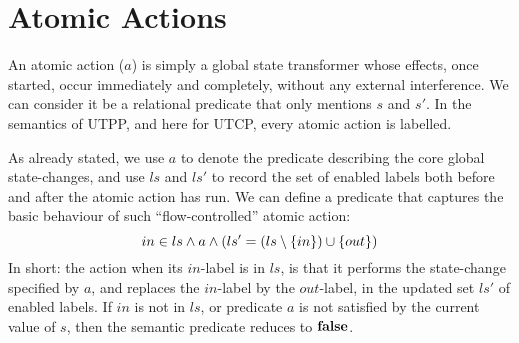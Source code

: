 \section{Atomic Actions}\label{sec:atomic}

An atomic action ($a$) is simply a global state transformer whose effects,
once started,
occur immediately and completely, without any external interference.
We can consider it be a relational predicate that only mentions $s$ and $s'$.
In the semantics of UTPP, and here for UTCP,
every atomic action is labelled.
%

As already stated,
we use $a$ to denote the predicate describing the core global state-changes,
and  use $ls$ and $ls'$ to record the set of enabled labels both before
and after the atomic action has run.
We can define a predicate that captures the basic behaviour
of such ``flow-controlled'' atomic action:
\begin{equation}
  in \in ls
  \land
  a
  \land
  (ls'=(ls\setminus\{{in}\})\cup\{{out}\})
  \label{pred:flow-atomic-action}
\end{equation}
In short: the action when its $in$-label is in $ls$,
is that it performs the state-change specified by $a$,
and replaces the $in$-label by the $out$-label,
in the updated set $ls'$ of enabled labels.
If $in$ is not in $ls$,
or predicate $a$ is not satisfied by the current value of $s$,
then the semantic predicate reduces to $\mathbf{false}$.


